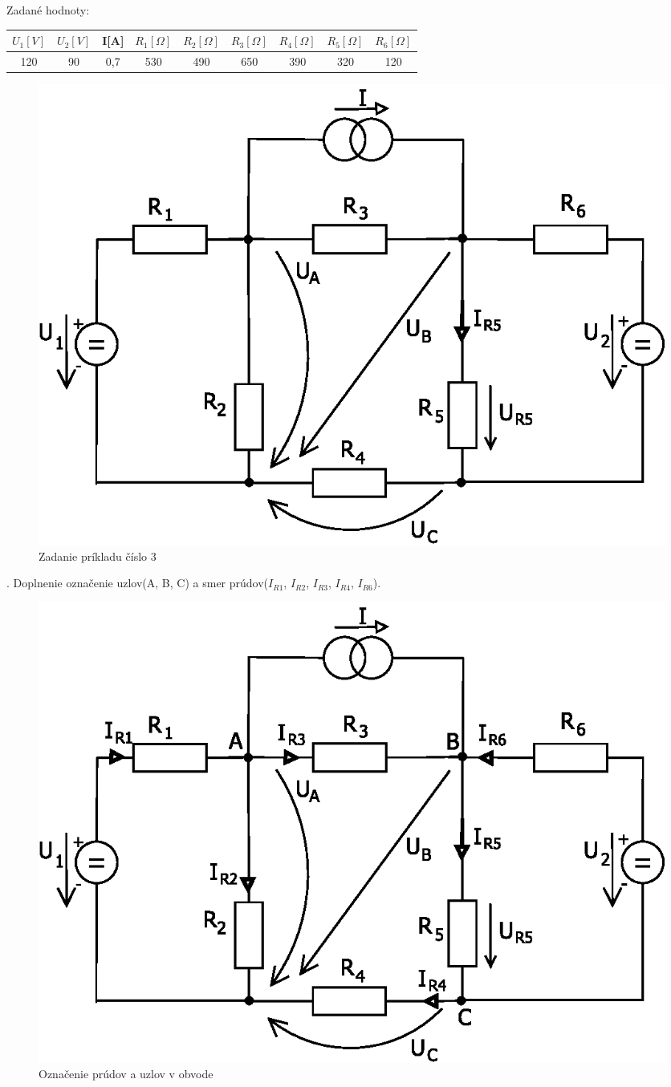 \documentclass[a4paper,12pt]{article}
\begin{document}
Zadané hodnoty:
\begin{center}
\begin{tabular} {| c | c | c | c | c | c | c | c | c | }
\hline
$U_1[V]$ & $U_2[V]$ & I[A] & $R_1[\Omega]$ & $R_2[\Omega]$ & $R_3[\Omega]$ & $R_4[\Omega]$ & $R_5[\Omega]$ & $R_6[\Omega]$ \\ \hline
120 & 90 & 0,7 & 530 & 490 & 650 & 390 & 320 & 120\\ \hline
\end{tabular}
\end{center}

\begin{figure}[!htb]
\centering
\includegraphics[scale=1.2]{p3/p0.eps}
\caption{Zadanie príkladu číslo 3}
\end{figure}


. Doplnenie označenie uzlov(A, B, C) a smer prúdov($I_{R1}$, $I_{R2}$, $I_{R3}$, $I_{R4}$, $I_{R6}$).
\begin{figure}[!htb]
\centering
\includegraphics[scale=1.0]{p3/p1.eps}
\caption{Označenie prúdov a uzlov v obvode}
\end{figure}
\end{document}
